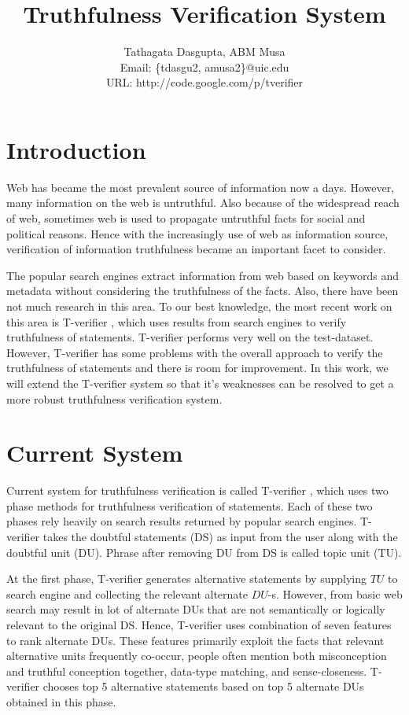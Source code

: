\documentclass[11pt]{article}
\begin{document}
\title{Truthfulness Verification System}

\author{
Tathagata Dasgupta, ABM Musa\\
Email: \{tdasgu2, amusa2\}@uic.edu\\
URL: http://code.google.com/p/tverifier }

\date{}
\maketitle


\section{Introduction}
Web has became the most prevalent source of information now a days. However, many
information on the web is untruthful. Also because of the widespread reach of
web, sometimes web is used to propagate untruthful facts for social and political
reasons. Hence with the increasingly use of web as information source,
verification of information truthfulness became an important facet to consider.

The popular search engines extract information from web based on keywords and
metadata without considering the truthfulness of the facts. Also, there have been
not much research in this area. To our best knowledge, the most recent work on this area is T-verifier  \cite{tverifier}, which uses results from search engines
to verify truthfulness of statements. T-verifier performs very well on the
test-dataset. However, T-verifier has some problems with the overall approach to
verify the truthfulness of statements and there is room for improvement. In this
work, we will extend the T-verifier system so that it's weaknesses can be
resolved to get a more robust truthfulness verification system.


\section{Current System}
Current system for truthfulness verification is called T-verifier
\cite{tverifier}, which uses two phase methods for truthfulness verification of
statements. Each of these two phases rely heavily on search results returned by
popular search engines. T-verifier takes the doubtful statements (DS) as input
from the user along with the doubtful unit (DU). Phrase after removing DU from DS
is called topic unit (TU).

At the first phase, T-verifier generates alternative statements by supplying
$TU$ to search engine and collecting the relevant alternate $DU$-s. However,
from basic web search may result in lot of alternate DUs that are not semantically or
logically relevant to the original DS. Hence, T-verifier uses combination of
seven features to rank alternate DUs. These features primarily exploit the facts
that relevant alternative units frequently co-occur, people often mention both
misconception and truthful conception together, data-type matching, and
sense-closeness. T-verifier chooses top 5 alternative statements based on top 5
alternate DUs obtained in this phase.
\end{document}

